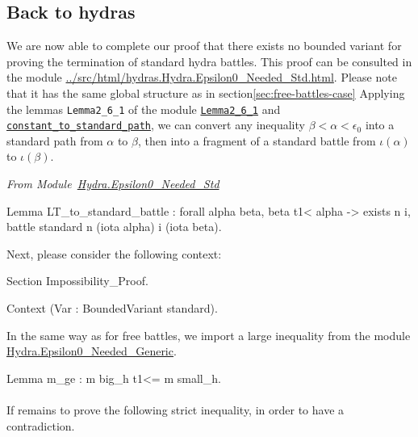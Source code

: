\documentclass[a4paper]{book}
\begin{document}
\subsection{Back to hydras}
\label{sec:standard-battles-cases}
We are now able to complete our proof that there exists no bounded variant for proving the termination of standard hydra battles. This proof can
be consulted in the module 
\url{../src/html/hydras.Hydra.Epsilon0_Needed_Std.html}.
Please note that it has the same global structure as in section\ref{sec:free-battles-case} 
Applying the  lemmas  \texttt{Lemma2\_6\_1} of the module 
\href{../src/html/hydras.Epsilon0.Paths.html\#Lemma2_6_1}%
{\texttt{Lemma2\_6\_1}}   and 
\href{../src/html/hydras.Epsilon0.Paths.html\#constant_to_standard_path}%
{\texttt{constant\_to\_standard\_path}},
we can convert any inequality $\beta<\alpha<\epsilon_0$ into a standard path from
$\alpha$ to  $\beta$, then into a fragment of a standard battle from 
$\iota(\alpha)$ to $\iota(\beta)$.


\vspace{4pt}
\emph{From Module~\href{../src/html/hydras.Hydra.Epsilon0_Needed_Std.html\#LT_to_standard_battle}{Hydra.Epsilon0\_Needed\_Std}}

\begin{Coqsrc}
Lemma LT_to_standard_battle :
    forall alpha beta,
      beta t1< alpha ->
      exists n i,  battle standard  n (iota alpha) i (iota beta).
\end{Coqsrc}


Next, please consider the following context:

\begin{Coqsrc}
Section Impossibility_Proof.
 
  Context (Var : BoundedVariant standard).
 \end{Coqsrc}

In the same way as for free battles, we import a large inequality 
from 
the module \href{../src/html/hydras.Hydra.Epsilon0_Needed_Generic.html}{Hydra.Epsilon0\_Needed\_Generic}.


\begin{Coqsrc}
 Lemma m_ge : m big_h t1<= m small_h.
\end{Coqsrc}

\paragraph*{} If remains to prove the following strict inequality, in order to have a contradiction.
\end{document}
